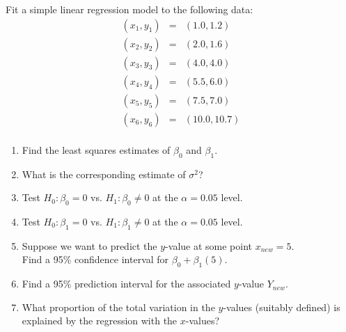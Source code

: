 \item Fit a simple linear regression model to the following data:
  \begin{eqnarray*}
    (x_1, y_1) &=& (1.0, 1.2)\\
    (x_2, y_2) &=& (2.0, 1.6)\\
    (x_3, y_3) &=& (4.0, 4.0)\\
    (x_4, y_4) &=& (5.5, 6.0)\\
    (x_5, y_5) &=& (7.5, 7.0)\\
    (x_6, y_6) &=& (10.0, 10.7)\\
  \end{eqnarray*}


  \begin{enumerate}
    \item Find the least squares estimates of $\beta_0$ and $\beta_1$.
    \item What is the corresponding estimate of $\sigma^2$?
    \item Test $H_0: \beta_0 = 0$ vs. $H_1: \beta_0 \neq 0$ at the $\alpha = 0.05$ level.
    \item Test $H_0: \beta_1 = 0$ vs. $H_1: \beta_1 \neq 0$ at the $\alpha = 0.05$ level.
    \item Suppose we want to predict the $y$-value at some point $x_{new} = 5$.\\
      Find a 95\% confidence interval for $\beta_0 + \beta_1 (5)$.
    \item Find a 95\% prediction interval for the associated $y$-value $Y_{new}$.
    \item What proportion of the total variation in the $y$-values (suitably defined) is explained by the regression with the $x$-values?
  \end{enumerate}


